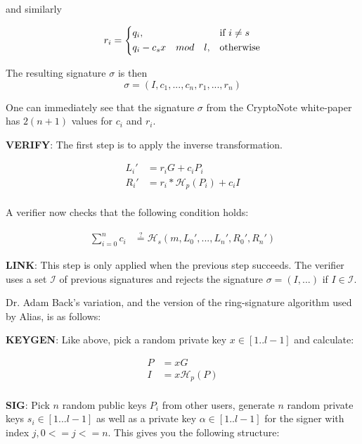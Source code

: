 and similarly

\[
r_i= 
\begin{dcases}
q_i,& \text{if } i \not= s\\
q_i-c_sx \quad mod\quad l,              & \text{otherwise}
\end{dcases}
\]

The resulting signature $\sigma$ is then
\[
\sigma = (I, c_1, ..., c_n, r_1, ..., r_n)
\]

One can immediately see that the signature $\sigma$ from the CryptoNote 
white-paper has $2(n+1)$ values for $c_i$ and $r_i$.

\hfill \break\textbf{VERIFY}: 
The first step is to apply the inverse transformation.

\begin{equation}
\begin{split}
L_i' &= r_iG+c_iP_i\\
R_i' &= r_i*\mathcal{H}_p(P_i)+c_iI\\ 
\end{split}
\end{equation}

A verifier now checks that the following condition holds:

\begin{equation}
\begin{split}
\sum_{i=0}^n c_i &\stackrel{?}{=}	 \mathcal{H}_s(m, L_0', ..., L_n', R_0', R_n')
\end{split}
\end{equation}

\hfill \break\textbf{LINK}: 
This step is only applied when the previous step succeeds. The verifier 
uses a set $\mathcal{I}$ of previous signatures and rejects the signature 
$\sigma = (I,... )$ if $I \in \mathcal{I}$.

\hfill \break Dr. Adam Back's variation, and the version of the ring-signature 
algorithm used by Alias, is as follows:

\hfill \break\textbf{KEYGEN}: Like above, pick a random private key 
$x \in [1..l-1]$ and calculate:

\begin{equation}
\begin{split}
P &= xG\\
I &= x\mathcal{H}_p(P)\\ 
\end{split}
\end{equation}

\hfill \break\textbf{SIG}: Pick $n$ random public keys $P_i$ from other 
users, generate $n$ random private keys $s_i \in [1...l-1]$ as well as a 
private key $\alpha \in [1..l-1]$ for the signer with index $j, 0<=j<=n$. 
This gives you the following structure:

